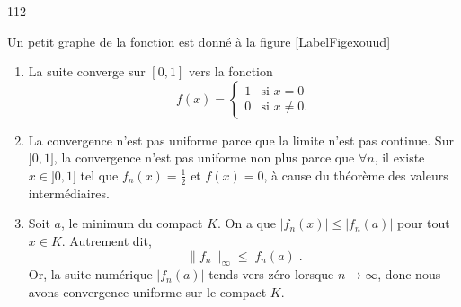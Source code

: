 

\begin{corrige}{112}

Un petit graphe de la fonction est donné à la figure \ref{LabelFigexouud}
\newcommand{\CaptionFigexouud}{Les parties non nulles de quelque unes des fonctions $f_n$.}


\begin{enumerate}
\item La suite converge sur $[0,1]$ vers la fonction
\begin{equation}
	f(x)=
\begin{cases}
	1	&	\text{si $x=0$}\\
	0	&	 \text{si $x\neq 0$}.
\end{cases}
\end{equation}

\item La convergence n'est pas uniforme parce que la limite n'est pas continue. Sur $]0,1]$, la convergence n'est pas uniforme non plus parce que $\forall n$, il existe $x\in]0,1]$ tel que $f_n(x)=\frac{ 1 }{2}$ et $f(x)=0$, à cause du théorème des valeurs intermédiaires.

\item Soit $a$, le minimum du compact $K$. On a que $| f_n(x) |\leq | f_n(a) |$ pour tout $x\in K$. Autrement dit,
\begin{equation}
	\| f_n \|_{\infty}\leq | f_n(a) |.
\end{equation}
Or, la suite numérique $| f_n(a) |$ tends vers zéro lorsque $n\to\infty$, donc nous avons convergence uniforme sur le compact $K$.
\end{enumerate}
\end{corrige}
